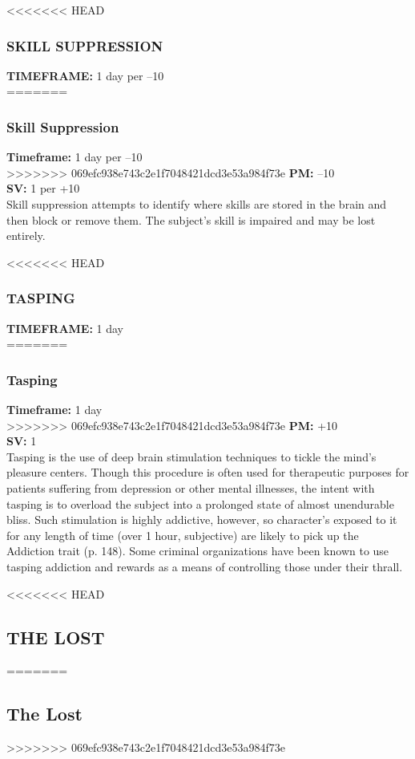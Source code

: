 <<<<<<< HEAD \subsubsection{SKILL SUPPRESSION} \textbf{TIMEFRAME:} 1 day per –10 \\ ======= \subsubsection{Skill Suppression} \textbf{Timeframe:} 1 day per –10 \\ >>>>>>> 069efc938e743c2e1f7048421dcd3e53a984f73e \textbf{PM:} –10 \\ \textbf{SV:} 1 per +10 \\ Skill suppression attempts to identify where skills are stored in the brain and then block or remove them. The subject’s skill is impaired and may be lost entirely. 

<<<<<<< HEAD \subsubsection{TASPING} \textbf{TIMEFRAME:} 1 day \\ ======= \subsubsection{Tasping} \textbf{Timeframe:} 1 day \\ >>>>>>> 069efc938e743c2e1f7048421dcd3e53a984f73e \textbf{PM:} +10 \\ \textbf{SV:} 1 \\ Tasping is the use of deep brain stimulation techniques to tickle the mind’s pleasure centers. Though this procedure is often used for therapeutic purposes for patients suffering from depression or other mental illnesses, the intent with tasping is to overload the subject into a prolonged state of almost unendurable bliss. Such stimulation is highly addictive, however, so character’s exposed to it for any length of time (over 1 hour, subjective) are likely to pick up the Addiction trait (p. 148). Some criminal organizations have been known to use tasping addiction and rewards as a means of controlling those under their thrall. 



<<<<<<< HEAD \subsection{THE LOST} ======= \subsection{The Lost} >>>>>>> 069efc938e743c2e1f7048421dcd3e53a984f73e 

